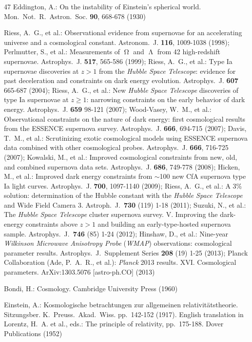 \documentclass[11pt]{article}
\begin{document}
\begin{thebibliography}{47}
 Eddington, A.: On the instability of Einstein's spherical world. Mon.\ Not.\ R.\ Astron.\ Soc. \textbf{90}, 668-678 (1930)

 Riess, A.~G., et al.: Observational evidence from supernovae for an accelerating universe and a cosmological constant. Astronom.\ J. \textbf{116}, 1009-1038 (1998); Perlmutter, S., et al.: Measurements of {$\upOmega$ and $\upLambda$} from 42 high-redshift supernovae. Astrophys.\ J. \textbf{517}, 565-586 (1999); Riess, A.~G., et al.: Type Ia supernovae discoveries at $z>1$ from the \textit{Hubble Space Telescope}: evidence for past deceleration and constraints on dark energy evolution. Astrophys.\ J. \textbf{607} 665-687 (2004); Riess, A.~G., et al.: New \textit{Hubble Space Telescope} discoveries of type Ia supernovae at $z\geq1$: narrowing constraints on the early behavior of dark energy. Astrophys.\ J. \textbf{659} 98-121 (2007); Wood-Vasey, W.~M., et al.: Observational constraints on the nature of dark energy: first cosmological results from the {ESSENCE} supernova survey. Astrophys.\ J. \textbf{666}, 694-715 (2007); Davis, T.~M., et al.: Scrutinizing exotic cosmological models using {ESSENCE} supernova data combined with other cosmological probes. Astrophys.\ J. \textbf{666}, 716-725 (2007); Kowalski, M., et al.: Improved cosmological constraints from new, old, and combined supernova data sets. Astrophys.\ J. \textbf{686}, 749-778 (2008); Hicken, M., et al.: Improved dark energy constraints from $\sim$100 new {CfA} supernova type {Ia} light curves. Astrophys.\ J. \textbf{700}, 1097-1140 (2009); Riess, A.~G., et al.: A 3\% solution: determination of the Hubble constant with the \textit{Hubble Space Telescope} and Wide Field Camera 3. Astroph.\ J.\ \textbf{730} (119) 1-18 (2011); Suzuki, N., et al.: The \textit{Hubble Space Telescope} cluster supernova survey. V. Improving the dark-energy constraints above $z>1$ and building an early-type-hosted supernova sample. Astrophys.\ J.\ \textbf{746} (85) 1-24 (2012); Hinshaw, D., et al.: Nine-year \textit{Wilkinson Microwave Anisotropy Probe} (\textit{WMAP}) observations: cosmological parameter results. Astrophys.\ J.\ Supplement Series \textbf{208} (19) 1-25 (2013); Planck Collaboration (Ade, P.~A.~R., et al.): \textit{Planck} 2013 results. XVI. Cosmological parameters. ArXiv:1303.5076 [astro-ph.CO] (2013)

 Bondi, H.: Cosmology. Cambridge University Press (1960)

 Einstein, A.: Kosmologische betrachtungen zur allgemeinen relativit{\"a}tstheorie. Sitzungsber. K.\ Preuss.\ Akad.\ Wiss. pp.~142-152 (1917). English translation in Lorentz, {H.~A.} et al., eds.: The principle of relativity, pp.~175-188. Dover Publications (1952) 


\end{thebibliography}
\end{document}
